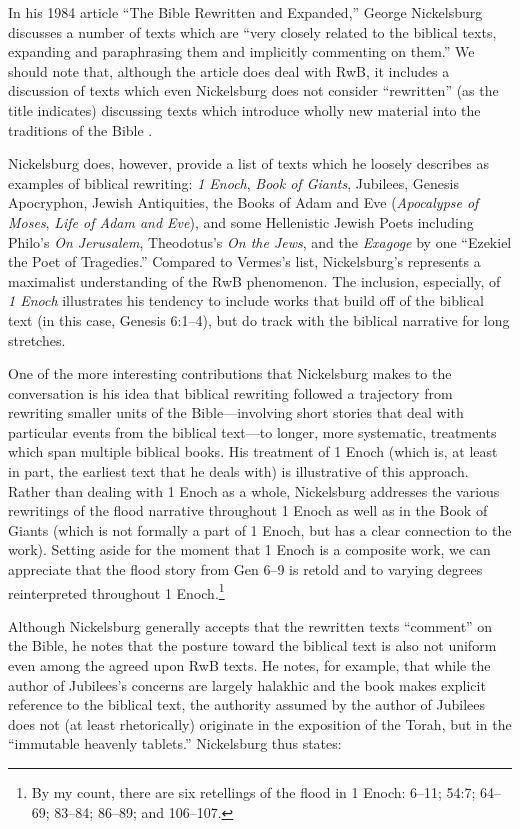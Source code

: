 In his 1984 article ``The Bible Rewritten and Expanded,'' George
Nickelsburg discusses a number of texts which are ``very closely related
to the biblical texts, expanding and paraphrasing them and implicitly
commenting on them.''\autocite[89]{nickelsburg_stone1984} We should note
that, although the article does deal with RwB, it includes a discussion
of texts which even Nickelsburg does not consider ``rewritten'' (as the
title indicates) discussing texts which introduce wholly new material
into the traditions of the Bible
\autocite[89--90]{nickelsburg_stone1984}.

Nickelsburg does, however, provide a list of texts which he loosely
describes as examples of biblical rewriting: \emph{1 Enoch}, \emph{Book
of Giants}, Jubilees, Genesis Apocryphon, Jewish Antiquities, the Books
of Adam and Eve (\emph{Apocalypse of Moses}, \emph{Life of Adam and
Eve}), and some Hellenistic Jewish Poets including Philo's \emph{On
Jerusalem}, Theodotus's \emph{On the Jews}, and the \emph{Exagoge} by
one ``Ezekiel the Poet of Tragedies.'' Compared to Vermes's list,
Nickelsburg's represents a maximalist understanding of the RwB
phenomenon. The inclusion, especially, of \emph{1 Enoch} illustrates his
tendency to include works that build off of the biblical text (in this
case, Genesis 6:1--4), but do track with the biblical narrative for long
stretches.

One of the more interesting contributions that Nickelsburg makes to the
conversation is his idea that biblical rewriting followed a trajectory
from rewriting smaller units of the Bible---involving short stories that
deal with particular events from the biblical text---to longer, more
systematic, treatments which span multiple biblical books. His treatment
of 1 Enoch (which is, at least in part, the earliest text that he deals
with) is illustrative of this approach. Rather than dealing with 1 Enoch
as a whole, Nickelsburg addresses the various rewritings of the flood
narrative throughout 1 Enoch as well as in the Book of Giants (which is
not formally a part of 1 Enoch, but has a clear connection to the work).
Setting aside for the moment that 1 Enoch is a composite work, we can
appreciate that the flood story from Gen 6--9 is retold and to varying
degrees reinterpreted throughout 1 Enoch.\footnote{By my count, there
  are six retellings of the flood in 1 Enoch: 6--11; 54:7; 64--69;
  83--84; 86--89; and 106--107.}

Although Nickelsburg generally accepts that the rewritten texts
``comment'' on the Bible, he notes that the posture toward the biblical
text is also not uniform even among the agreed upon RwB texts. He notes,
for example, that while the author of Jubilees's concerns are largely
halakhic and the book makes explicit reference to the biblical text, the
authority assumed by the author of Jubilees does not (at least
rhetorically) originate in the exposition of the Torah, but in the
``immutable heavenly
tablets.''\autocite[100--101]{nickelsburg_stone1984} Nickelsburg thus
states:

